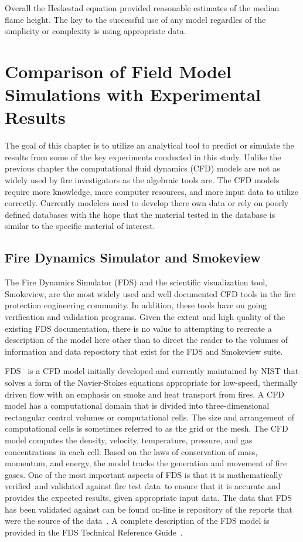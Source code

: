 \documentclass[twoside]{uocthesis}
\begin{document}
{Overall the Heskestad equation provided reasonable estimates of the median flame height.  The key to the successful use of any model regardles of the simplicity or complexity is using appropriate data. 

\chapter{Comparison of Field Model Simulations with Experimental Results}

The goal of this chapter is to utilize an analytical tool to predict or simulate the results from some of the key experiments conducted in this study. Unlike the previous chapter the computational fluid dynamics (CFD) models are not as widely used by fire investigators as the algebraic tools are.  The CFD models require more knowledge, more computer resources, and more input data to utilize correctly.  Currently modelers need to develop there own data or rely on poorly defined databases with the hope that the material tested in the database is similar to the specific material of interest.       

\section{Fire Dynamics Simulator and Smokeview}

The Fire Dynamics Simulator (FDS) and the scientific visualization tool, Smokeview, are the most widely used and well documented CFD tools in the fire protection engineering community. In addition, these tools have on going verification and validation programs.  Given the extent and high quality of the existing FDS documentation, there is no value to attempting to recreate a description of the model here other than to direct the reader to the volumes of information and data repository that exist for the FDS and Smokeview suite.

FDS~\cite{FDS_Users_Guide} is a CFD model initially developed and currently maintained by NIST that solves a form of the Navier-Stokes equations appropriate for low-speed, thermally driven flow with an emphasis on smoke and heat transport from fires. A CFD model has a computational domain that is divided into  three-dimensional rectangular control volumes or computational cells. The size and arrangement of computational cells is sometimes referred to as the grid or the mesh.  The CFD model computes the density, velocity, temperature, pressure, and gas concentrations in each cell. Based on the laws of conservation of mass, momentum, and energy, the model tracks the generation and movement of fire gases. One of the most important aspects of FDS is that it is mathematically verified~\cite{FDS_Verification_Guide}and validated against fire test data~\cite{FDS_Validation_Guide}to ensure that it is accurate and provides the expected results, given appropriate input data.  The data that FDS has been validated against can be found on-line is repository of the reports that were the source of the data~\cite{FDS-SMV_repository}. A complete description of the FDS model is provided in the FDS Technical Reference Guide~\cite{FDS_Tech_Guide}.  

}
\end{document}
